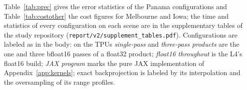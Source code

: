 \documentclass[11pt]{article}
\begin{document}
Table~\ref{tab:prec} gives the error statistics of the Panama configurations and Table~\ref{tab:costother} the cost figures for Melbourne and Iowa; the time and statistics of every configuration on each scene are in the supplementary tables of the study repository (\texttt{report/v2/supplement\_tables.pdf}). Configurations are labeled as in the body: on the TPUs \emph{single-pass} and \emph{three-pass products} are the one and three bfloat16 passes of a float32 product; \emph{float16 throughout} is the L4's float16 build; \emph{JAX program} marks the pure JAX implementation of Appendix~\ref{app:kernels}; exact backprojection is labeled by its interpolation and the oversampling of its range profiles.


\end{document}
